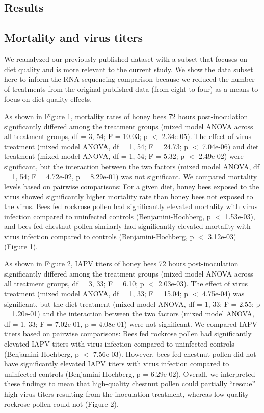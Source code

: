\documentclass{bmcart}
\begin{document}
\begin{linenumbers}
\begin{doublespacing}
\section*{Results}

\subsection*{Mortality and virus titers}

We reanalyzed our previously published dataset with a subset that focuses on diet quality and is more relevant to the current study. We show the data subset here to inform the RNA-sequencing comparison because we reduced the number of treatments from the original published data (from eight to four) \cite{adamInt} as a means to focus on diet quality effects.

As shown in Figure 1, mortality rates of honey bees 72 hours post-inoculation significantly differed among the treatment groups (mixed model ANOVA across all treatment groups, df = 3, 54; F = 10.03; p $<$ 2.34e-05). The effect of virus treatment (mixed model ANOVA, df = 1, 54; F = 24.73; p $<$ 7.04e-06) and diet treatment (mixed model ANOVA, df = 1, 54; F = 5.32; p $<$ 2.49e-02) were significant, but the interaction between the two factors (mixed model ANOVA, df = 1, 54; F = 4.72e-02, p = 8.29e-01) was not significant. We compared mortality levels based on pairwise comparisons: For a given diet, honey bees exposed to the virus showed significantly higher mortality rate than honey bees not exposed to the virus. Bees fed rockrose pollen had significantly elevated mortality with virus infection compared to uninfected controls (Benjamini-Hochberg, p $<$ 1.53e-03), and bees fed chestnut pollen similarly had significantly elevated mortality with virus infection compared to controls (Benjamini-Hochberg, p $<$ 3.12e-03) (Figure 1).

As shown in Figure 2, IAPV titers of honey bees 72 hours post-inoculation significantly differed among the treatment groups (mixed model ANOVA across all treatment groups, df = 3, 33; F = 6.10; p $<$ 2.03e-03). The effect of virus treatment (mixed model ANOVA, df = 1, 33; F = 15.04; p $<$ 4.75e-04) was significant, but the diet treatment (mixed model ANOVA, df = 1, 33; F = 2.55; p = 1.20e-01) and the interaction between the two factors (mixed model ANOVA, df = 1, 33; F = 7.02e-01, p = 4.08e-01) were not significant. We compared IAPV titers  based on pairwise comparisons: Bees fed rockrose pollen had significantly elevated IAPV titers with virus infection compared to uninfected controls (Benjamini Hochberg, p $<$ 7.56e-03). However, bees fed chestnut pollen did not have significantly elevated IAPV titers with virus infection compared to uninfected controls (Benjamini Hochberg, p = 6.29e-02). Overall, we interpreted these findings to mean that high-quality chestnut pollen could partially ``rescue'' high virus titers resulting from the inoculation treatment, whereas low-quality rockrose pollen could not (Figure 2).


\end{doublespacing}
\end{linenumbers}
\end{document}
